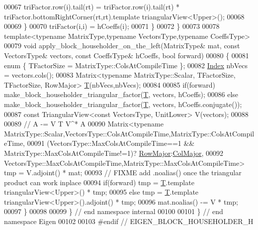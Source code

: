 \begin{DoxyCode}
00067       triFactor.row(i).tail(rt) = triFactor.row(i).tail(rt) * triFactor.bottomRightCorner(rt,rt).template 
      triangularView<Upper>();
00068       
00069     \}
00070     triFactor(i,i) = hCoeffs(i);
00071   \}
00072 \}
00073 
00078 \textcolor{keyword}{template}<\textcolor{keyword}{typename} MatrixType,\textcolor{keyword}{typename} VectorsType,\textcolor{keyword}{typename} CoeffsType>
00079 \textcolor{keywordtype}{void} apply\_block\_householder\_on\_the\_left(MatrixType& mat, \textcolor{keyword}{const} VectorsType& vectors, \textcolor{keyword}{const} CoeffsType& 
      hCoeffs, \textcolor{keywordtype}{bool} forward)
00080 \{
00081   \textcolor{keyword}{enum} \{ TFactorSize = MatrixType::ColsAtCompileTime \};
00082   \hyperlink{namespace_eigen_a62e77e0933482dafde8fe197d9a2cfde}{Index} nbVecs = vectors.cols();
00083   Matrix<typename MatrixType::Scalar, TFactorSize, TFactorSize, RowMajor> \hyperlink{group___sparse_core___module_class_eigen_1_1_triplet}{T}(nbVecs,nbVecs);
00084   
00085   \textcolor{keywordflow}{if}(forward) make\_block\_householder\_triangular\_factor(\hyperlink{group___sparse_core___module_class_eigen_1_1_triplet}{T}, vectors, hCoeffs);
00086   \textcolor{keywordflow}{else}        make\_block\_householder\_triangular\_factor(\hyperlink{group___sparse_core___module_class_eigen_1_1_triplet}{T}, vectors, hCoeffs.conjugate());  
00087   \textcolor{keyword}{const} TriangularView<const VectorsType, UnitLower> V(vectors);
00088 
00089   \textcolor{comment}{// A -= V T V^* A}
00090   Matrix<\textcolor{keyword}{typename} MatrixType::Scalar,VectorsType::ColsAtCompileTime,MatrixType::ColsAtCompileTime,
00091          (VectorsType::MaxColsAtCompileTime==1 && MatrixType::MaxColsAtCompileTime!=1)?
      \hyperlink{group__enums_ggaacded1a18ae58b0f554751f6cdf9eb13acfcde9cd8677c5f7caf6bd603666aae3}{RowMajor}:\hyperlink{group__enums_ggaacded1a18ae58b0f554751f6cdf9eb13a0cbd4bdd0abcfc0224c5fcb5e4f6669a}{ColMajor},
00092          VectorsType::MaxColsAtCompileTime,MatrixType::MaxColsAtCompileTime> tmp = V.adjoint() * mat;
00093   \textcolor{comment}{// FIXME add .noalias() once the triangular product can work inplace}
00094   \textcolor{keywordflow}{if}(forward) tmp = \hyperlink{group___sparse_core___module_class_eigen_1_1_triplet}{T}.template triangularView<Upper>()           * tmp;
00095   \textcolor{keywordflow}{else}        tmp = \hyperlink{group___sparse_core___module_class_eigen_1_1_triplet}{T}.template triangularView<Upper>().adjoint() * tmp;
00096   mat.noalias() -= V * tmp;
00097 \}
00098 
00099 \} \textcolor{comment}{// end namespace internal}
00100 
00101 \} \textcolor{comment}{// end namespace Eigen}
00102 
00103 \textcolor{preprocessor}{#endif // EIGEN\_BLOCK\_HOUSEHOLDER\_H}
\end{DoxyCode}
